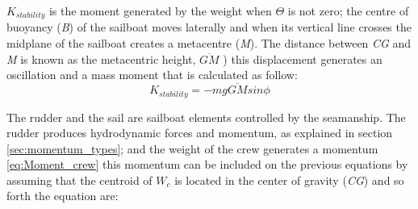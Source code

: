 \textit{ $ K_{stability} $ } is the moment generated by the weight when $\Theta$ is not zero; the centre of buoyancy (\textit{B}) of the sailboat moves laterally and when its vertical line crosses the midplane of the sailboat creates a metacentre (\textit{M}). The distance between \textit{CG} and \textit{M} is known as the metacentric height, \textit{$\overline{GM}$} ) \cite{patterson2014ship} this displacement generates an oscillation and a mass moment that is calculated as follow:
\begin{equation} \label{eq:k_stability}
    K_{stability}=-mg\overline{GM} sin \phi 
\end{equation}

The rudder and the sail are sailboat elements controlled by the seamanship. 
The rudder produces hydrodynamic forces and momentum, as explained in section \ref{sec:momentum_types}; and the weight of the crew generates a momentum \ref{eq:Moment_crew} 
this momentum can be included on the previous equations by assuming that the centroid of $W_{c}$ is located in the center of gravity (\textit{CG}) and so forth the equation are:\par

